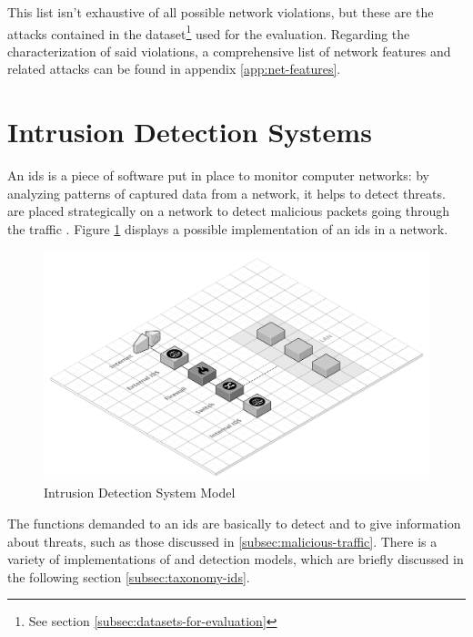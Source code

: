 This list isn't exhaustive of all possible network violations, but these are the attacks contained in the dataset\footnote{See section \ref{subsec:datasets-for-evaluation}} used for the evaluation. Regarding the characterization of said violations, a comprehensive list of network features and related attacks can be found in appendix \ref{app:net-features}.
\textcolor{dimgray}{\lipsum[1]}


\section{Intrusion Detection Systems}
\label{sec:intrusion-detection-system}

An \gls{ids} is a piece of software put in place to monitor computer networks: by analyzing patterns of captured data from a network, it helps to detect threats.  are placed strategically on a network to detect malicious packets going through the traffic \cite{Hodo2017}. Figure \ref{fig:IDS-model} displays a possible implementation of an \gls{ids} in a network.

\begin{figure}[h!]
        \centering
        \includegraphics[scale=0.2]{assets/figures/chapter2/Intrusion Detection System Model.png}
        \caption{Intrusion Detection System Model}
        \label{fig:IDS-model}
\end{figure}
The functions demanded to an \gls{ids} are basically to detect and to give information about threats, such as those discussed in \ref{subsec:malicious-traffic}. There is a variety of implementations of  and detection models, which are briefly discussed in the following section \ref{subsec:taxonomy-ids}.


